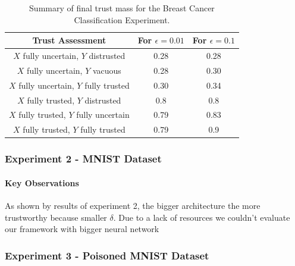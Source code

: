 \begin{table}[ht]
\centering
\begin{tabular}{|c|c|c|}
\hline
Trust Assessment & For \(\epsilon = 0.01\) & For \(\epsilon = 0.1\) \\
\hline
\(X\) fully uncertain, \(Y\) distrusted & 0.28 & 0.28 \\
\hline
\(X\) fully uncertain, \(Y\) vacuous & 0.28 & 0.30 \\
\hline
\(X\) fully uncertain, \(Y\) fully trusted & 0.30 & 0.34 \\
\hline
\(X\) fully trusted, \(Y\) distrusted & 0.8 & 0.8 \\
\hline
\(X\) fully trusted, \(Y\) fully uncertain & 0.79 & 0.83 \\
\hline
\(X\) fully trusted, \(Y\) fully trusted & 0.79 & 0.9 \\
\hline
\end{tabular}
\caption{Summary of final trust mass for the Breast Cancer Classification Experiment.}
\label{tab:cancer_results}
\end{table}


\subsubsection{Experiment 2 - MNIST Dataset}

\paragraph{Key Observations}
As shown by results of experiment 2, the bigger architecture the more trustworthy because smaller \( \delta \). Due to a lack of resources we couldn't evaluate our framework with bigger neural network



\subsubsection{Experiment 3 - Poisoned MNIST Dataset}



















